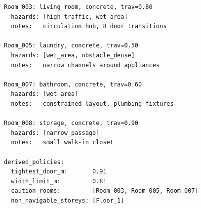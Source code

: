 \documentclass[a4paper, 10pt, conference]{ieeeconf}
\begin{document}
\begin{lstlisting}[caption={Short summary of the BasicHouse briefing derived from the agent trace. The full agent trace is larger and includes stage-by-stage details.},label={lst:brief},float=t!,floatplacement=t]
Room_003: living_room, concrete, trav=0.80
  hazards: [high_traffic, wet_area]
  notes:   circulation hub, 8 door transitions

Room_005: laundry, concrete, trav=0.50
  hazards: [wet_area, obstacle_dense]
  notes:   narrow channels around appliances

Room_007: bathroom, concrete, trav=0.60
  hazards: [wet_area]
  notes:   constrained layout, plumbing fixtures

Room_008: storage, concrete, trav=0.90
  hazards: [narrow_passage]
  notes:   small walk-in closet

derived_policies:
  tightest_door_m:       0.91
  width_limit_m:         0.81
  caution_rooms:         [Room_003, Room_005, Room_007]
  non_navigable_storeys: [Floor_1]
\end{lstlisting}
\end{document}
